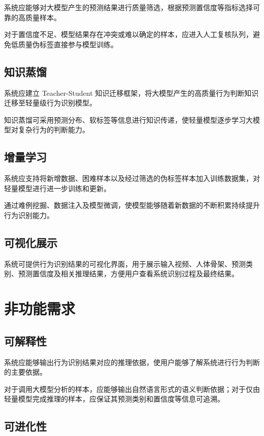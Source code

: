 系统应能够对大模型产生的预测结果进行质量筛选，根据预测置信度等指标选择可靠的高质量样本。

对于置信度不足、模型结果存在冲突或难以确定的样本，应进入人工复核队列，避免低质量伪标签直接参与模型训练。

\subsection{知识蒸馏}

系统应建立 Teacher-Student 知识迁移框架，将大模型产生的高质量行为判断知识迁移至轻量级行为识别模型。

知识蒸馏可采用预测分布、软标签等信息进行知识传递，使轻量模型逐步学习大模型对复杂行为的判断能力。

\subsection{增量学习}

系统应支持将新增数据、困难样本以及经过筛选的伪标签样本加入训练数据集，对轻量模型进行进一步训练和更新。

通过难例挖掘、数据注入及模型微调，使模型能够随着新数据的不断积累持续提升行为识别能力。

\subsection{可视化展示}

系统可提供行为识别结果的可视化界面，用于展示输入视频、人体骨架、预测类别、预测置信度及相关推理结果，方便用户查看系统识别过程及最终结果。

\section{非功能需求}

\subsection{可解释性}

系统应能够输出行为识别结果对应的推理依据，使用户能够了解系统进行行为判断的主要依据。

对于调用大模型分析的样本，应能够输出自然语言形式的语义判断依据；对于仅由轻量模型完成推理的样本，应保证其预测类别和置信度等信息可追溯。

\subsection{可进化性}


